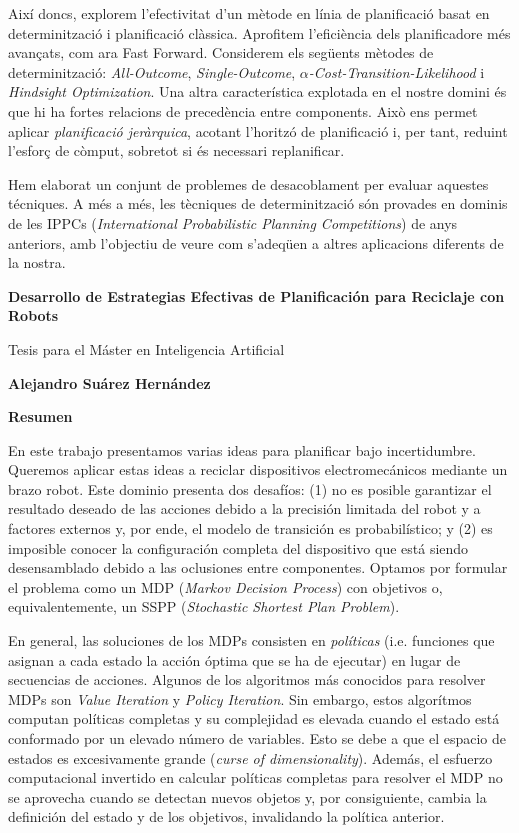 Així doncs, explorem l'efectivitat d'un mètode en línia de planificació
basat en determinització i planificació clàssica. Aprofitem l'eficiència
dels planificadore més avançats, com ara Fast Forward. Considerem els
següents mètodes de determinització: \emph{All-Outcome}, \emph{Single-Outcome},
\emph{$ \alpha $-Cost-Transition-Likelihood} i \emph{Hindsight Optimization}.
Una altra característica explotada en el nostre domini és que hi ha fortes
relacions de precedència entre
components. Això ens permet aplicar \emph{planificació jeràrquica}, acotant
l'horitzó de planificació i, per tant, reduint l'esforç de còmput,
sobretot si és necessari replanificar.

Hem elaborat un conjunt de problemes de desacoblament per evaluar aquestes
técniques. A més a més, les tècniques de determinització són provades en
dominis de les IPPCs (\emph{International Probabilistic Planning Competitions}) de
anys anteriors, amb l'objectiu de veure com s'adeqüen a altres aplicacions
diferents de la nostra.

\cleardoublepage

\thispagestyle{plain}
\begin{center}
	\Large
	\textbf{Desarrollo de Estrategias Efectivas de Planificación para Reciclaje con Robots}
	
	\vspace{0.4cm}
	\large
	Tesis para el Máster en Inteligencia Artificial
	
	\vspace{0.4cm}
	\textbf{Alejandro Suárez Hernández}
	
	\vspace{0.9cm}
	\textbf{Resumen}
\end{center}

En este trabajo presentamos varias ideas para planificar bajo
incertidumbre. Queremos aplicar estas ideas a reciclar
dispositivos electromecánicos mediante un brazo robot. Este dominio
presenta dos desafíos: (1) no es posible garantizar el resultado deseado
de las acciones debido a la precisión limitada del robot y a factores
externos y, por ende, el modelo de transición es probabilístico; y (2)
es imposible conocer la configuración completa del dispositivo que
está siendo
desensamblado debido a las oclusiones entre componentes. Optamos
por formular el problema como un MDP (\emph{Markov Decision Process})
con objetivos o, equivalentemente, un SSPP (\emph{Stochastic Shortest Plan Problem}).

En general, las soluciones de los MDPs consisten en \emph{políticas} (i.e.
funciones que asignan a cada estado la acción óptima que se ha de ejecutar)
en lugar de secuencias de acciones. Algunos de los algoritmos más conocidos para
resolver MDPs son \emph{Value Iteration} y \emph{Policy Iteration}. Sin embargo,
estos algorítmos computan políticas completas y su complejidad es elevada cuando
el estado está conformado por un elevado número de variables. Esto se debe a que
el espacio de estados es excesivamente grande (\emph{curse of dimensionality}).
Además, el esfuerzo computacional invertido en calcular políticas completas para
resolver el MDP no se aprovecha cuando se detectan nuevos objetos y, por consiguiente,
cambia la definición del estado y de los objetivos, invalidando la política anterior.

